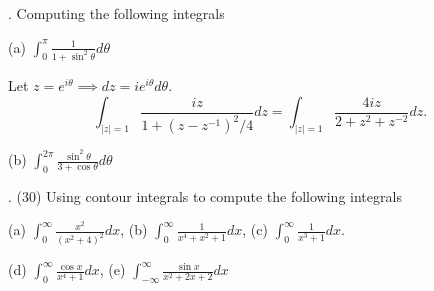 \documentclass[letterpaper, reqno,11pt]{article}
\begin{document}
\medskip

. Computing the following integrals

(a) $\int_0^{\pi} \frac{1}{ 1+\sin^2 \theta} d \theta $

Let $z=e^{i\theta}\implies dz=ie^{i\theta}d\theta$. 
\[
\int_{|z|=1}\frac{iz}{1+\left( z-z^{-1} \right)^2 /4}dz=\int_{|z|=1}\frac{4iz}{2+z^2+z^{-2}}dz
.\]

(b) $ \int_0^{2\pi} \frac{ \sin^2 \theta}{ 3+\cos \theta} d \theta $


\medskip


. (30) Using contour integrals to  compute the following integrals

(a) $\int_0^\infty \frac{ x^2}{ (x^2+4)^2} dx$, (b) $ \int_0^\infty \frac{1}{ x^4+x^2+1} dx $,  (c) $\int_0^\infty \frac{1}{ x^3+1} dx $.


(d) $ \int_0^\infty \frac{\cos x}{ x^4 +1} dx $, (e) $\int_{-\infty}^\infty \frac{ \sin x}{ x^2+2x+2} dx $
\end{document}
